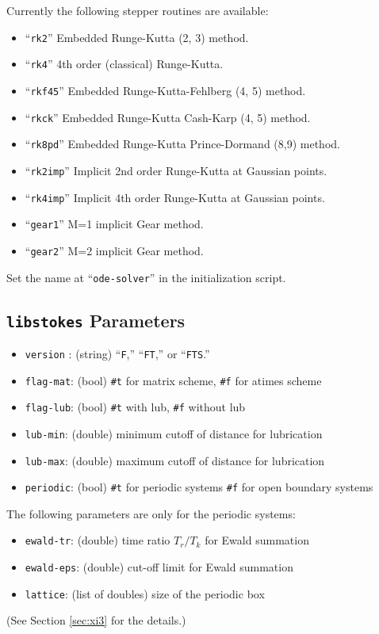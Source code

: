 \documentclass{book}
\begin{document}
Currently the following stepper routines are available:
\begin{itemize}
\item ``{\tt rk2}''       Embedded Runge-Kutta (2, 3) method.
\item ``{\tt rk4}''       4th order (classical) Runge-Kutta.
\item ``{\tt rkf45}''     Embedded Runge-Kutta-Fehlberg (4, 5) method.
\item ``{\tt rkck}''      Embedded Runge-Kutta Cash-Karp (4, 5) method.
\item ``{\tt rk8pd}''     Embedded Runge-Kutta Prince-Dormand (8,9) method.
\item ``{\tt rk2imp}''    Implicit 2nd order Runge-Kutta at Gaussian points.
\item ``{\tt rk4imp}''    Implicit 4th order Runge-Kutta at Gaussian points.
\item ``{\tt gear1}''     M=1 implicit Gear method.
\item ``{\tt gear2}''     M=2 implicit Gear method.
\end{itemize}
Set the name at ``{\tt ode-solver}'' in the initialization script.


\subsection{{\tt libstokes} Parameters}
\begin{itemize}
\item {\tt version} : (string) ``{\tt F},'' ``{\tt FT},'' or ``{\tt FTS}.''
\item {\tt flag-mat}: (bool)
  {\tt \#t} for matrix scheme,
  {\tt \#f} for atimes scheme
\item {\tt flag-lub}: (bool)
  {\tt \#t} with lub,
  {\tt \#f} without lub
\item {\tt lub-min}: (double) minimum cutoff of distance for lubrication
\item {\tt lub-max}: (double) maximum cutoff of distance for lubrication
\item {\tt periodic}: (bool)
  {\tt \#t} for periodic systems
  {\tt \#f} for open boundary systems
\end{itemize}
The following parameters are only for the periodic systems:
\begin{itemize}
\item {\tt ewald-tr}: (double) time ratio $T_r/T_k$ for Ewald summation
\item {\tt ewald-eps}: (double) cut-off limit for Ewald summation
\item {\tt lattice}: (list of doubles) size of the periodic box
\end{itemize}
(See Section \ref{sec:xi3} for the details.)
\end{document}

